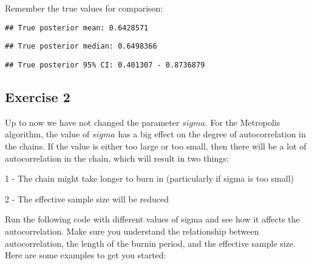 \documentclass[
  12pt,
]{article}
\begin{document}
Remember the true values for comparison:

\begin{verbatim}
## True posterior mean: 0.6428571
\end{verbatim}

\begin{verbatim}
## True posterior median: 0.6498366
\end{verbatim}

\begin{verbatim}
## True posterior 95% CI: 0.401307 - 0.8736879
\end{verbatim}

\hypertarget{exercise-2}{%
\subsection{Exercise 2}\label{exercise-2}}

Up to now we have not changed the parameter \(sigma\). For the
Metropolis algorithm, the value of \(sigma\) has a big effect on the
degree of autocorrelation in the chains. If the value is either too
large or too small, then there will be a lot of autocorrelation in the
chain, which will result in two things:

1 - The chain might take longer to burn in (particularly if sigma is too
small)

2 - The effective sample size will be reduced

Run the following code with different values of sigma and see how it
affects the autocorrelation. Make sure you understand the relationship
between autocorrelation, the length of the burnin period, and the
effective sample size. Here are some examples to get you started:
\end{document}
